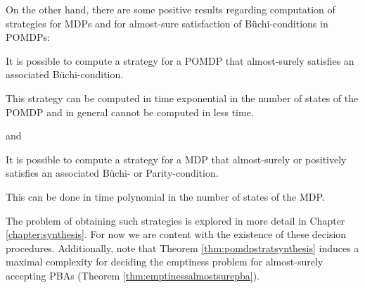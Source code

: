 On the other hand, there are some positive results regarding computation of 
strategies for \acp{MDP} and for almost-sure satisfaction of Büchi-conditions
in \acp{POMDP}:
\begin{theorem}
  \cite[Theorem 5]{QualAnaPOMDP}
  It is possible to compute a strategy for a \ac{POMDP} that almost-surely
  satisfies an associated Büchi-condition. 

  This strategy can be computed in
  time exponential in the number of states of the \ac{POMDP} and in general
  cannot be computed in less time.
  \label{thm:pomdpstratsynthesis}
\end{theorem}
and
\begin{theorem}
  \cite[Theorem 1.1]{QuanStochParityGames}
  It is possible to compute a strategy for a \ac{MDP} that almost-surely or
  positively satisfies an associated Büchi- or Parity-condition.

  This can be done in time polynomial in the number of states of the \ac{MDP}.
  \label{thm:mdpstratsynthesis}
\end{theorem}
The problem of obtaining such strategies is explored in more detail in Chapter
\ref{chapter:synthesis}. For now we are content with the existence of these 
decision procedures. Additionally, note that Theorem 
\ref{thm:pomdpstratsynthesis} induces a maximal complexity for deciding the 
emptiness problem for almost-surely accepting \acp{PBA} (Theorem 
\ref{thm:emptinessalmostsurepba}).
